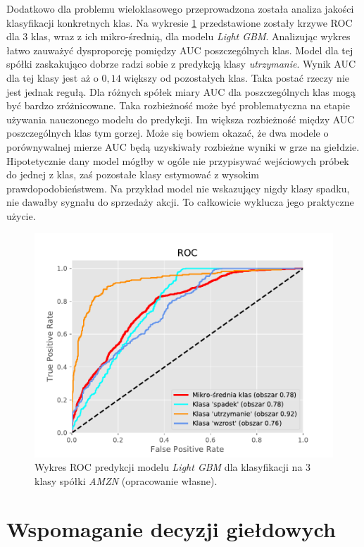 \documentclass[a4paper, twoside, 11pt, openright]{article}
\begin{document}
Dodatkowo dla problemu wieloklasowego przeprowadzona została analiza jakości klasyfikacji konkretnych klas. Na wykresie \ref{img:lgbm_roc_amzn} przedstawione zostały krzywe ROC dla 3 klas, wraz z ich mikro-średnią, dla modelu \textit{Light GBM}. Analizując wykres łatwo zauważyć dysproporcję pomiędzy AUC poszczególnych klas. Model dla tej spółki zaskakująco dobrze radzi sobie z predykcją klasy \textit{utrzymanie}. Wynik AUC dla tej klasy jest aż o $0,14$ większy od pozostałych klas. Taka postać rzeczy nie jest jednak regułą. Dla różnych spółek miary AUC dla poszczególnych klas mogą być bardzo zróżnicowane. Taka rozbieżność może być problematyczna na etapie używania nauczonego modelu do predykcji. Im większa rozbieżność między AUC poszczególnych klas tym gorzej. Może się bowiem okazać, że dwa modele o porównywalnej mierze AUC będą uzyskiwały rozbieżne wyniki w grze na giełdzie. Hipotetycznie dany model mógłby w ogóle nie przypisywać wejściowych próbek do jednej z klas, zaś pozostałe klasy estymować z wysokim prawdopodobieństwem. Na przykład model nie wskazujący nigdy klasy spadku, nie dawałby sygnału do sprzedaży akcji. To całkowicie wyklucza jego praktyczne użycie.

\begin{figure}[H]
\centering \includegraphics[scale=0.8]{img/AMZN_roc_lgbm.pdf}
\caption{Wykres ROC predykcji modelu \textit{Light GBM} dla klasyfikacji na 3 klasy spółki \textit{AMZN} (opracowanie własne).}
\label{img:lgbm_roc_amzn}
\end{figure}

\newpage

\section{Wspomaganie decyzji giełdowych}
\end{document}
